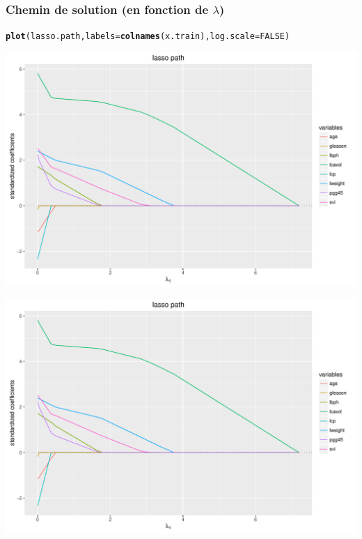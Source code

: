 \documentclass{beamer}\usepackage[]{graphicx}\usepackage[]{color}
\makeatletter
\newcommand{\hlnum}[1]{\textcolor[rgb]{0.686,0.059,0.569}{#1}}%
\newcommand{\hlstd}[1]{\textcolor[rgb]{0.345,0.345,0.345}{#1}}%
\newcommand{\hlkwc}[1]{\textcolor[rgb]{0.333,0.667,0.333}{#1}}%
\newcommand{\hlkwd}[1]{\textcolor[rgb]{0.737,0.353,0.396}{\textbf{#1}}}%
\newenvironment{kframe}{%
 \def\at@end@of@kframe{}%
 \ifinner\ifhmode%
  \def\at@end@of@kframe{\end{minipage}}%
  \begin{minipage}{\columnwidth}%
 \fi\fi%
 \def\FrameCommand##1{\hskip\@totalleftmargin \hskip-\fboxsep
 \colorbox{shadecolor}{##1}\hskip-\fboxsep
     \hskip-\linewidth \hskip-\@totalleftmargin \hskip\columnwidth}%
 \MakeFramed {\advance\hsize-\width
   \@totalleftmargin\z@ \linewidth\hsize
   \@setminipage}}%
 {\par\unskip\endMakeFramed%
 \at@end@of@kframe}
\newenvironment{knitrout}{}{} %
\makeatother
\begin{document}
\begin{frame}[containsverbatim]
  \frametitle{Chemin de solution (en fonction de $\lambda$)}

\begin{knitrout}\scriptsize
{}\color{fgcolor}\begin{kframe}
\begin{alltt}
\hlkwd{plot}\hlstd{(lasso.path,} \hlkwc{labels}\hlstd{=}\hlkwd{colnames}\hlstd{(x.train),} \hlkwc{log.scale}\hlstd{=}\hlnum{FALSE}\hlstd{)}
\end{alltt}
\end{kframe}
\includegraphics[width=\textwidth]{figures/lasso-unnamed-chunk-65-1} 

\includegraphics[width=\textwidth]{figures/lasso-unnamed-chunk-65-2} 

\end{knitrout}
\end{frame}
\end{document}

